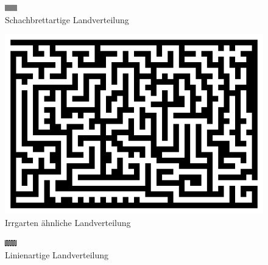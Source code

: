 \documentclass[a4paper,12pt]{article}
\begin{document}
\begin{figure}[H]
\centering
    \includegraphics[width=0.7\linewidth]{Bilder/Aufgabe3/schachbrett.png}
    \caption{Schachbrettartige Landverteilung}
\end{figure}
\begin{figure}[H]
\centering
    \includegraphics[width=0.7\linewidth]{Bilder/Aufgabe3/irrgarten.png}
    \caption{Irrgarten ähnliche Landverteilung}
\end{figure}
\begin{figure}[H]
\centering
    \includegraphics[width=0.7\linewidth]{Bilder/Aufgabe3/linien.png}
    \caption{Linienartige Landverteilung}
\end{figure}


\end{document}
